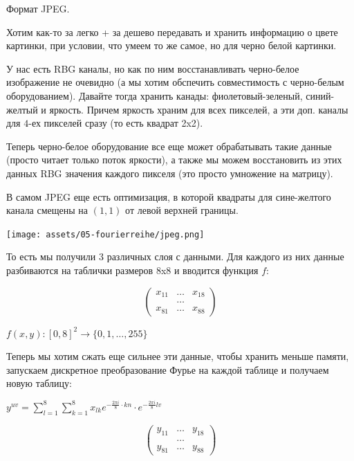 \begin{remark}
    Формат JPEG.


    Хотим как-то за легко + за дешево передавать и хранить информацию о цвете картинки, при условии, что умеем то же самое, но для черно белой картинки.

    У нас есть RBG каналы, но как по ним восстанавливать черно-белое изображение не очевидно (а мы хотим обспечить совместимость с черно-белым оборудованием). Давайте тогда хранить канады: фиолетовый-зеленый, синий-желтый и яркость. Причем яркость храним для всех пикселей, а эти доп. каналы для $4$-ех пикселей сразу (то есть квадрат 2x2).

    Теперь черно-белое оборудование все еще может обрабатывать такие данные (просто читает только поток яркости), а также мы можем восстановить из этих данных RBG значения каждого пикселя (это просто умножение на матрицу).

    В самом JPEG еще есть оптимизация, в которой квадраты для сине-желтого канала смещены на $(1, 1)$ от левой верхней границы.

    \begin{center}
        \texttt{[image: assets/05-fourierreihe/jpeg.png]}
    \end{center}

    То есть мы получили 3 различных слоя с данными. Для каждого из них данные разбиваются на таблички размеров 8x8 и вводится функция $f$:

    $$\begin{pmatrix}
        x_{11} & \ldots & x_{18} \\
        & \ldots \\
        x_{81} & \ldots & x_{88}
    \end{pmatrix}$$

    $f(x, y): [0, 8]^2 \to \{ 0, 1, \ldots, 255 \}$

    Теперь мы хотим сжать еще сильнее эти данные, чтобы хранить меньше памяти, запускаем дискретное преобразование Фурье на каждой таблице и получаем новую таблицу:

    $y^{uv} = \sum_{l=1}^{8} \sum_{k=1}^{8} x_{lk} e^{- \frac{2 \pi i}{8} \cdot kn} \cdot e^{- \frac{2 \pi i}{8} l v}$

    $$\begin{pmatrix}
    y_{11} & \ldots & y_{18} \\
    & \ldots \\
    y_{81} & \ldots & y_{88}
    \end{pmatrix}$$


\end{remark}
